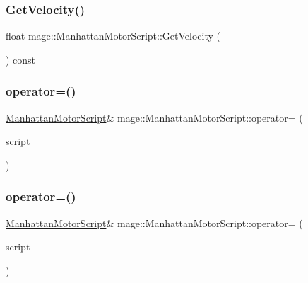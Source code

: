 \subsubsection{\texorpdfstring{Get\+Velocity()}{GetVelocity()}}
{\footnotesize\ttfamily float mage\+::\+Manhattan\+Motor\+Script\+::\+Get\+Velocity (\begin{DoxyParamCaption}{ }\end{DoxyParamCaption}) const\hspace{0.3cm}{\ttfamily [noexcept]}}

\hypertarget{classmage_1_1_manhattan_motor_script_a563d4d429bbcabf25f57539857dde53c}{}\label{classmage_1_1_manhattan_motor_script_a563d4d429bbcabf25f57539857dde53c} 
\subsubsection{\texorpdfstring{operator=()}{operator=()}\hspace{0.1cm}{\footnotesize\ttfamily [1/2]}}
{\footnotesize\ttfamily \hyperlink{classmage_1_1_manhattan_motor_script}{Manhattan\+Motor\+Script}\& mage\+::\+Manhattan\+Motor\+Script\+::operator= (\begin{DoxyParamCaption}\item[{const \hyperlink{classmage_1_1_manhattan_motor_script}{Manhattan\+Motor\+Script} \&}]{script }\end{DoxyParamCaption})\hspace{0.3cm}{\ttfamily [delete]}}

\hypertarget{classmage_1_1_manhattan_motor_script_a944149dc06764bc23feffde4de100679}{}\label{classmage_1_1_manhattan_motor_script_a944149dc06764bc23feffde4de100679} 
\subsubsection{\texorpdfstring{operator=()}{operator=()}\hspace{0.1cm}{\footnotesize\ttfamily [2/2]}}
{\footnotesize\ttfamily \hyperlink{classmage_1_1_manhattan_motor_script}{Manhattan\+Motor\+Script}\& mage\+::\+Manhattan\+Motor\+Script\+::operator= (\begin{DoxyParamCaption}\item[{\hyperlink{classmage_1_1_manhattan_motor_script}{Manhattan\+Motor\+Script} \&\&}]{script }\end{DoxyParamCaption})\hspace{0.3cm}{\ttfamily [delete]}}

